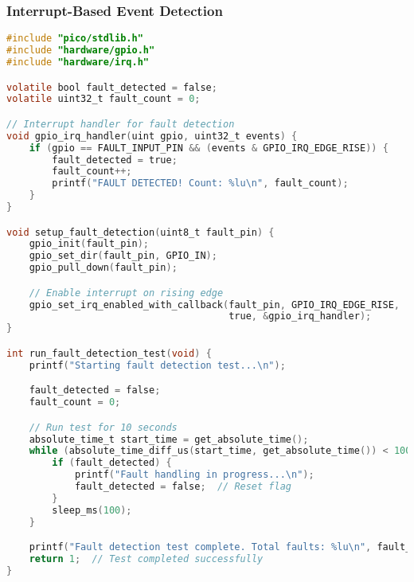 \documentclass{beamer}
\begin{document}
\begin{frame}[fragile]
\frametitle{Interrupt-Based Event Detection}
\begin{lstlisting}[language=C]
#include "pico/stdlib.h"
#include "hardware/gpio.h"
#include "hardware/irq.h"

volatile bool fault_detected = false;
volatile uint32_t fault_count = 0;

// Interrupt handler for fault detection
void gpio_irq_handler(uint gpio, uint32_t events) {
    if (gpio == FAULT_INPUT_PIN && (events & GPIO_IRQ_EDGE_RISE)) {
        fault_detected = true;
        fault_count++;
        printf("FAULT DETECTED! Count: %lu\n", fault_count);
    }
}

void setup_fault_detection(uint8_t fault_pin) {
    gpio_init(fault_pin);
    gpio_set_dir(fault_pin, GPIO_IN);
    gpio_pull_down(fault_pin);

    // Enable interrupt on rising edge
    gpio_set_irq_enabled_with_callback(fault_pin, GPIO_IRQ_EDGE_RISE,
                                       true, &gpio_irq_handler);
}

int run_fault_detection_test(void) {
    printf("Starting fault detection test...\n");

    fault_detected = false;
    fault_count = 0;

    // Run test for 10 seconds
    absolute_time_t start_time = get_absolute_time();
    while (absolute_time_diff_us(start_time, get_absolute_time()) < 10000000) {
        if (fault_detected) {
            printf("Fault handling in progress...\n");
            fault_detected = false;  // Reset flag
        }
        sleep_ms(100);
    }

    printf("Fault detection test complete. Total faults: %lu\n", fault_count);
    return 1;  // Test completed successfully
}
\end{lstlisting}
\end{frame}
\end{document}
